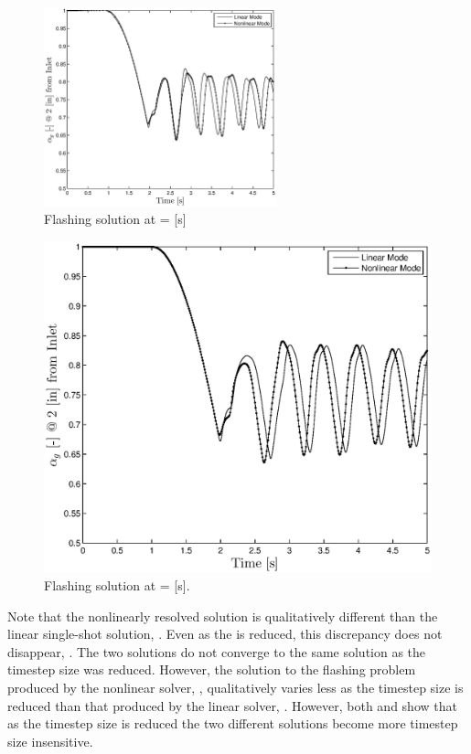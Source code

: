 \begin{figure}[h!tb]
\centering
\includegraphics[width=0.6\textwidth]{plots/flashing_1em1.eps}
\caption{Flashing solution at \dtmax{} =  {[s]}}
\label{fig:flashing_1em1}
\end{figure}

\begin{figure}[h!tb]
\centering
\includegraphics[width=.6\textwidth]{plots/flashing_1em5.eps}
\caption{Flashing solution at \dtmax{} =  {[s]}.}
\label{fig:flashing_1em5}
\end{figure}

Note that the nonlinearly resolved solution is qualitatively different than the linear single-shot solution, .
Even as the \dtmax{} is reduced, this discrepancy does not disappear, .
The two solutions do not converge to the same solution as the timestep size was reduced.
However, the solution to the flashing problem produced by the nonlinear solver, , qualitatively varies less as the timestep size is reduced than that produced by the linear solver, .
However, both  and  show that as the timestep size is reduced the two different solutions become more timestep size insensitive.

